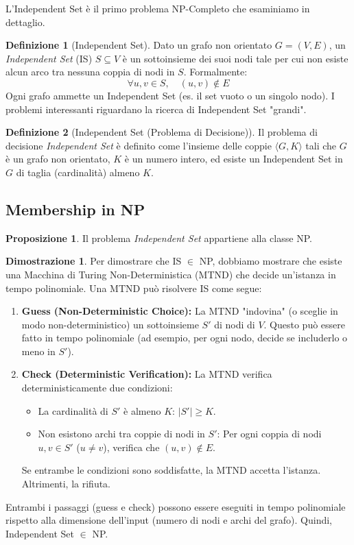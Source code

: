 \documentclass[a4paper]{article}
\theoremstyle{definition} %
\newtheorem{definition}{Definizione}[section]
\newtheorem{proposition}{Proposizione}[section]
\theoremstyle{definition} %
\newtheorem*{proof*}{Dimostrazione}
\begin{document}
L'Independent Set è il primo problema NP-Completo che esaminiamo in dettaglio.

\begin{definition}[Independent Set]
Dato un grafo non orientato $G=(V, E)$, un \emph{Independent Set} (IS) $S \subseteq V$ è un sottoinsieme dei suoi nodi tale per cui non esiste alcun arco tra nessuna coppia di nodi in $S$. Formalmente:
\[ \forall u, v \in S, \quad (u, v) \notin E \]
Ogni grafo ammette un Independent Set (es. il set vuoto o un singolo nodo). I problemi interessanti riguardano la ricerca di Independent Set "grandi".
\end{definition}

\begin{definition}[Independent Set (Problema di Decisione)]
Il problema di decisione \emph{Independent Set} è definito come l'insieme delle coppie $\langle G, K \rangle$ tali che $G$ è un grafo non orientato, $K$ è un numero intero, ed esiste un Independent Set in $G$ di taglia (cardinalità) almeno $K$.
\end{definition}

\subsection{Membership in NP}

\begin{proposition}
Il problema \emph{Independent Set} appartiene alla classe NP.
\end{proposition}

\begin{proof*}
Per dimostrare che IS $\in$ NP, dobbiamo mostrare che esiste una Macchina di Turing Non-Deterministica (MTND) che decide un'istanza in tempo polinomiale.
Una MTND può risolvere IS come segue:
\begin{enumerate}
    \item \textbf{Guess (Non-Deterministic Choice):} La MTND "indovina" (o sceglie in modo non-deterministico) un sottoinsieme $S'$ di nodi di $V$. Questo può essere fatto in tempo polinomiale (ad esempio, per ogni nodo, decide se includerlo o meno in $S'$).
    \item \textbf{Check (Deterministic Verification):} La MTND verifica deterministicamente due condizioni:
    \begin{itemize}
        \item La cardinalità di $S'$ è almeno $K$: $|S'| \ge K$.
        \item Non esistono archi tra coppie di nodi in $S'$: Per ogni coppia di nodi $u, v \in S'$ ($u \ne v$), verifica che $(u, v) \notin E$.
    \end{itemize}
    Se entrambe le condizioni sono soddisfatte, la MTND accetta l'istanza. Altrimenti, la rifiuta.
\end{enumerate}
Entrambi i passaggi (guess e check) possono essere eseguiti in tempo polinomiale rispetto alla dimensione dell'input (numero di nodi e archi del grafo). Quindi, Independent Set $\in$ NP.
\end{proof*}
\end{document}
